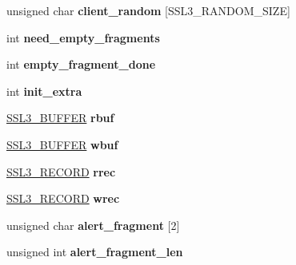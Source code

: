 \begin{DoxyCompactItemize}
\item 
\mbox{\label{structssl3__state__st_a08ccdbf1359a0d714bb7c1934dc3e7d4}} 
unsigned char {\bfseries client\+\_\+random} \mbox{[}S\+S\+L3\+\_\+\+R\+A\+N\+D\+O\+M\+\_\+\+S\+I\+ZE\mbox{]}
\item 
\mbox{\label{structssl3__state__st_aa7dc2c2f9d03ff717c3aef1051784357}} 
int {\bfseries need\+\_\+empty\+\_\+fragments}
\item 
\mbox{\label{structssl3__state__st_a97e5546af9e51f39f4a6c9f7b73ba1b1}} 
int {\bfseries empty\+\_\+fragment\+\_\+done}
\item 
\mbox{\label{structssl3__state__st_ac744a39f9703118ad914799059630a70}} 
int {\bfseries init\+\_\+extra}
\item 
\mbox{\label{structssl3__state__st_afe5098e88b32cad3b79243f2b53f6040}} 
\hyperlink{structssl3__buffer__st}{S\+S\+L3\+\_\+\+B\+U\+F\+F\+ER} {\bfseries rbuf}
\item 
\mbox{\label{structssl3__state__st_a96b970880608f297b54db97424330be3}} 
\hyperlink{structssl3__buffer__st}{S\+S\+L3\+\_\+\+B\+U\+F\+F\+ER} {\bfseries wbuf}
\item 
\mbox{\label{structssl3__state__st_affde905dbcf7ece7aab929f37ffe043a}} 
\hyperlink{structssl3__record__st}{S\+S\+L3\+\_\+\+R\+E\+C\+O\+RD} {\bfseries rrec}
\item 
\mbox{\label{structssl3__state__st_ab3e2700e58172be629db1f2af7ef510a}} 
\hyperlink{structssl3__record__st}{S\+S\+L3\+\_\+\+R\+E\+C\+O\+RD} {\bfseries wrec}
\item 
\mbox{\label{structssl3__state__st_ac5746677681e98a0ca4e3fb0551dd1df}} 
unsigned char {\bfseries alert\+\_\+fragment} \mbox{[}2\mbox{]}
\item 
\mbox{\label{structssl3__state__st_aa3a633681eec7c0c4a21564e21f3df8b}} 
unsigned int {\bfseries alert\+\_\+fragment\+\_\+len}
\item 

\end{DoxyCompactItemize}
